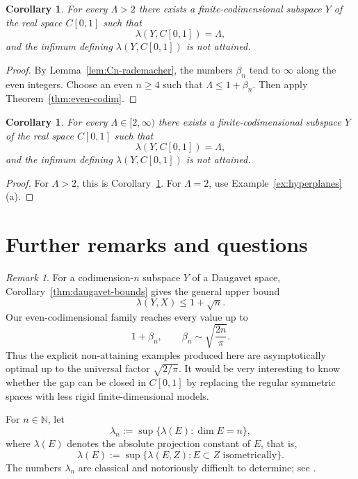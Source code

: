 \documentclass[11pt]{amsart}
\numberwithin{equation}{section}
\newtheorem{corollary}[theorem]{Corollary}
\theoremstyle{definition}
\theoremstyle{remark}
\newtheorem{remark}[theorem]{Remark}
\newcommand{\N}{\mathbb N}
\begin{document}
\begin{corollary}
\label{cor:all-lambda->2}
For every $\Lambda>2$ there exists a finite-codimensional subspace $Y$ of the real space $C[0,1]$ such that
\[
\lambda(Y,C[0,1])=\Lambda,
\]
and the infimum defining $\lambda(Y,C[0,1])$ is not attained.
\end{corollary}

\begin{proof}
By Lemma~\ref{lem:Cn-rademacher}, the numbers $\beta_n$ tend to $\infty$ along the even integers. Choose an even $n\geqslant 4$ such that $\Lambda\leqslant 1+\beta_n$. Then apply Theorem~\ref{thm:even-codim}.
\end{proof}

\begin{corollary}
\label{cor:all-lambda>=2}
For every $\Lambda\in[2,\infty)$ there exists a finite-codimensional subspace $Y$ of the real space $C[0,1]$ such that
\[
\lambda(Y,C[0,1])=\Lambda,
\]
and the infimum defining $\lambda(Y,C[0,1])$ is not attained.
\end{corollary}

\begin{proof}
For $\Lambda>2$, this is Corollary~\ref{cor:all-lambda->2}. For $\Lambda=2$, use Example~\ref{ex:hyperplanes}(a).
\end{proof}

\section{Further remarks and questions}
\label{sec:remarks}

\begin{remark}
For a codimension-$n$ subspace $Y$ of a Daugavet space, Corollary~\ref{thm:daugavet-bounds} gives the general upper bound
\[
\lambda(Y,X)\leqslant 1+\sqrt n.
\]
Our even-codimensional family reaches every value up to
\[
1+\beta_n,
\qquad
\beta_n\sim \sqrt{\frac{2n}{\pi}}.
\]
Thus the explicit non-attaining examples produced here are asymptotically optimal up to the universal factor $\sqrt{2/\pi}$. It would be very interesting to know whether the gap can be closed in $C[0,1]$ by replacing the regular symmetric spaces with less rigid finite-dimensional models.

For $n\in\N$, let
\[
\lambda_n:=\sup\{\lambda(E): \dim E=n\},
\]
where $\lambda(E)$ denotes the absolute projection constant of $E$, that is,
\[
\lambda(E):=\sup\{\lambda(E,Z): E\subset Z \text{ isometrically}\}.
\]
The numbers $\lambda_n$ are classical and notoriously difficult to determine; see \cite{Grunbaum,KLL,BB22,BB23}.
\end{remark}
\end{document}
